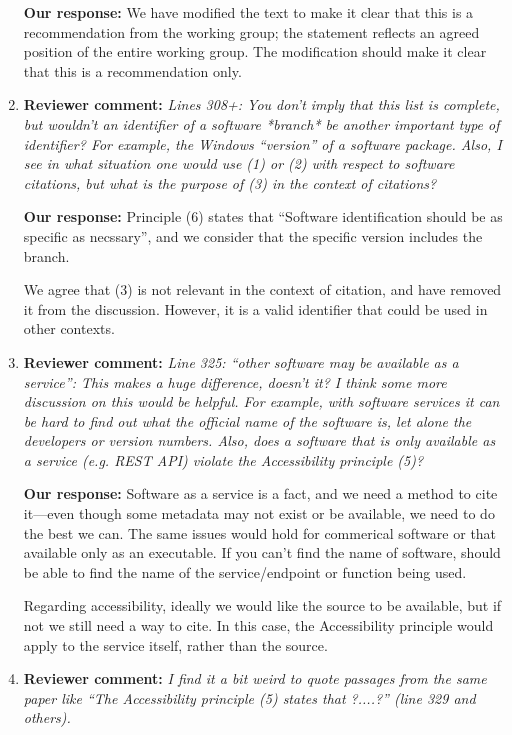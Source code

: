 \documentclass{article}
\begin{document}
\begin{enumerate}
\textbf{Our response:}
We have modified the text to make it clear that this is a recommendation from the working group; the statement reflects an agreed position of the entire working group. The modification should make it clear that this is a recommendation only.

\item \textbf{Reviewer comment:}
\emph{Lines 308+: You don't imply that this list is complete, but wouldn't an identifier of a software *branch* be another important type of identifier? For example, the Windows ``version'' of a software package. Also, I see in what situation one would use (1) or (2) with respect to software citations, but what is the purpose of (3) in the context of citations?}

\textbf{Our response:}
Principle (6) states that ``Software identification should be as specific as necssary'', and we consider that the specific version includes the branch.

We agree that (3) is not relevant in the context of citation, and have removed it from the discussion.
However, it is a valid identifier that could be used in other contexts.

\item \textbf{Reviewer comment:}
\emph{Line 325: ``other software may be available as a service'': This makes a huge difference, doesn't it? I think some more discussion on this would be helpful. For example, with software services it can be hard to find out what the official name of the software is, let alone the developers or version numbers. Also, does a software that is only available as a service (e.g. REST API) violate the Accessibility principle (5)?}

\textbf{Our response:}
Software as a service is a fact, and we need a method to cite it---even though some metadata may not exist or be available, we need to do the best we can.
The same issues would hold for commerical software or that available only as an executable.
If you can't find the name of software, should be able to find the name of the service\slash endpoint or function being used.

Regarding accessibility, ideally we would like the source to be available, but if not we still need a way to cite.
In this case, the Accessibility principle would apply to the service itself, rather than the source.


\item \textbf{Reviewer comment:}
\emph{I find it a bit weird to quote passages from the same paper like ``The Accessibility principle (5) states that ?....?'' (line 329 and others).}


\end{enumerate}
\end{document}

